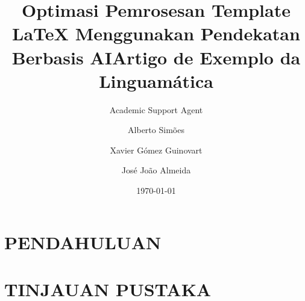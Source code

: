 \documentclass{article}
\title{Optimasi Pemrosesan Template LaTeX Menggunakan Pendekatan Berbasis AI}
\author{Academic Support Agent}
\date{\today}
\begin{document}
\maketitle

\begin{abstract}

\end{abstract}

\chapter{PENDAHULUAN}


\chapter{TINJAUAN PUSTAKA}



\usepackage[portuges]{babel}
\usepackage{linguamatica}







\title{Artigo de Exemplo da Linguamática}



\author{
  Alberto Simões
  \and 
  Xavier Gómez Guinovart
  \and
  José João Almeida
}
\end{document}
